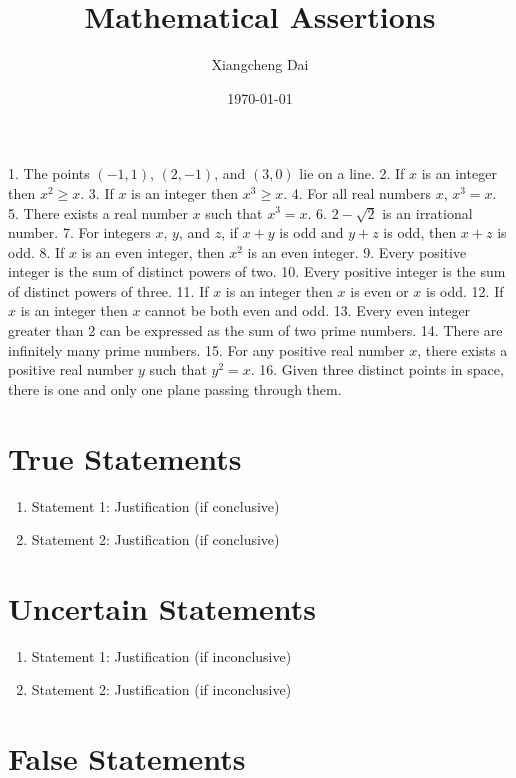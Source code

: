 \documentclass{article}
\begin{document}
\title{Mathematical Assertions}
\author{Xiangcheng Dai}
\date{\today}

\maketitle

1. The points $(-1,1)$, $(2,-1)$, and $(3,0)$ lie on a line.
2. If $x$ is an integer then $x^2 \geq x$.
3. If $x$ is an integer then $x^3 \geq x$.
4. For all real numbers $x$, $x^3 = x$.
5. There exists a real number $x$ such that $x^3 = x$.
6. $2 - \sqrt{2}$ is an irrational number.
7. For integers $x$, $y$, and $z$, if $x+y$ is odd and $y+z$ is odd, then $x+z$ is odd.
8. If $x$ is an even integer, then $x^2$ is an even integer.
9. Every positive integer is the sum of distinct powers of two.
10. Every positive integer is the sum of distinct powers of three.
11. If $x$ is an integer then $x$ is even or $x$ is odd.
12. If $x$ is an integer then $x$ cannot be both even and odd.
13. Every even integer greater than 2 can be expressed as the sum of two prime numbers.
14. There are infinitely many prime numbers.
15. For any positive real number $x$, there exists a positive real number $y$ such that $y^2 = x$.
16. Given three distinct points in space, there is one and only one plane passing through them.

\section{True Statements}

\begin{enumerate}
    \item Statement 1: Justification (if conclusive)
    \item Statement 2: Justification (if conclusive)
\end{enumerate}

\section{Uncertain Statements}

\begin{enumerate}
    \item Statement 1: Justification (if inconclusive)
    \item Statement 2: Justification (if inconclusive)
\end{enumerate}

\section{False Statements}
\end{document}
